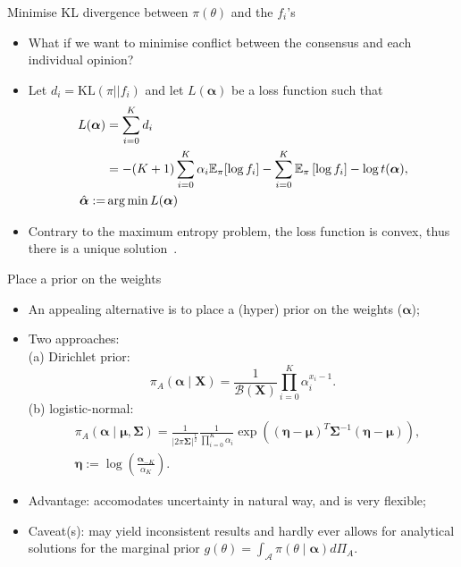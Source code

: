 \begin{frame}{Minimise KL divergence between $\pi(\theta)$ and the $f_i$'s}
\begin{itemize}
 \item What if we want to minimise conflict between the consensus and each individual opinion?
 \item Let $d_i = \text{KL}(\pi || f_i)$ and let $L(\boldsymbol\alpha)$ be a loss function such that
\begin{align*}
L(\boldsymbol\alpha) &= \sum_{i=0}^Kd_i \\
     &=  - (K+1) \sum_{i=0}^K\alpha_i\mathbb{E}_\pi [\log f_i ]  - \sum_{i=0}^K \mathbb{E}_\pi\left[\log f_i\right] - \log t(\boldsymbol\alpha), \\
     \hat{\boldsymbol\alpha}:=& \operatorname*{arg\,min} L(\boldsymbol\alpha)   
\end{align*}
\item Contrary to the maximum entropy problem, the loss function is convex, thus there is a unique solution~\citep{rufo2012A}.
\end{itemize}
\end{frame}
\begin{frame}{Place a prior on the weights}
 \begin{itemize}
  \item An appealing alternative is to place a (hyper) prior on the weights ($\boldsymbol\alpha$);
  \item Two approaches:\\
 (a) Dirichlet prior:
\[ \pi_A(\boldsymbol\alpha \mid \boldsymbol X) = \frac{1}{\mathcal{B}(\boldsymbol X)}\prod_{i=0}^K \alpha_i^{x_i-1}.\]
 (b) logistic-normal:
 \begin{align*}
  &\pi_A(\boldsymbol\alpha \mid \boldsymbol \mu, \boldsymbol \Sigma) = \frac{1}{|2\pi \boldsymbol \Sigma|^{\frac{1}{2}}}\frac{1}{\prod_{i=0}^K \alpha_i}
  \exp\left(
     \left(\boldsymbol \eta - \boldsymbol \mu\right)^T
     {\boldsymbol \Sigma}^{-1}
     \left( \boldsymbol \eta - \boldsymbol \mu\right)
     \right),\\
      &\boldsymbol \eta := \log\left(\frac{\boldsymbol \alpha_{-K}}{\alpha_K}\right).
 \end{align*}
 \item Advantage: accomodates uncertainty in natural way, and is very flexible;
 \item Caveat(s): may yield inconsistent results and hardly ever allows for analytical solutions for the marginal prior $g(\theta) = \int_{\mathcal{A}} \pi(\theta \mid \boldsymbol\alpha)d\Pi_A$.
 \end{itemize}
\end{frame}
